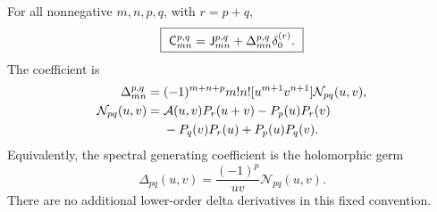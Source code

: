 \begin{theorem}\label{pc:main}
For all nonnegative $m,n,p,q$, with $r=p+q$,
\begin{equation}\label{pc:mainformula}
 \boxed{\ \mathsf C_{mn}^{p,q}=\mathsf J_{mn}^{p,q}
                     +\Delta_{mn}^{p,q}\delta_0^{(r)}.\ }
\end{equation}
The coefficient is
\begin{align}\label{pc:deltacoeff}
 \Delta_{mn}^{p,q}={}&(-1)^{m+n+p}m!n![u^{m+1}v^{n+1}]\mathcal N_{pq}(u,v),\\
 \mathcal N_{pq}(u,v)={}&\mathcal A(u,v)P_r(u+v)-P_p(u)P_r(v)\notag\\
 &-P_q(v)P_r(u)+P_p(u)P_q(v).\label{pc:N}
\end{align}
Equivalently, the spectral generating coefficient is the holomorphic germ
\begin{equation}\label{pc:Deltagen}
 \Delta_{pq}(u,v)=\frac{(-1)^p}{uv}\mathcal N_{pq}(u,v).
\end{equation}
There are no additional lower-order delta derivatives in this fixed convention.
\end{theorem}
